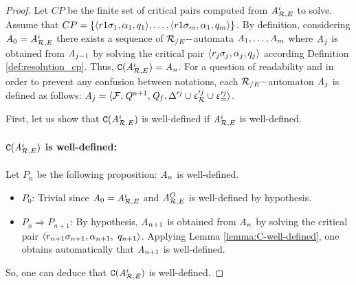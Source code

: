 \begin{proof}

  Let $CP$ be the finite set of critical pairs computed from
  ${\it A}_{\mathcal R,E}^i$ to solve.  Assume that $CP=\{\langle
  r1\sigma_1,\alpha_1,q_1\rangle,\ldots, \langle r1\sigma_m,\alpha_1,q_m\rangle
  \}$. By definition, considering $\mathit A_0={\it A}_{\mathcal R,E}^i$ there exists a
  sequence of ${\mathcal R_{/E}}-$automata $\mathit A_1,\ldots,\mathit A_m$ where $\mathit A_j$ is obtained
  from $\mathit A_{j-1}$ by solving the critical pair $\langle r_j\sigma_j,
  \alpha_j,q_j\rangle$ according Definition \ref{def:resolution_cp}. Thus, 
  $\mathtt{C}({\it A}_{\mathcal R,E}^i)=\mathit A_n$. For a 
  question of readability and in order to prevent any confusion between notations, 
  each ${\mathcal R_{/E}}-$automaton $\mathit A_j$ is defined as follows:  $\mathit A_j=\langle \mathcal{F},\mathit Q^{n+1},\mathit Q_{f},\Delta'^{j}\cup \upvarepsilon_{\mathcal R}'^{j}\cup\upvarepsilon_{=}'^{j} \rangle$.

  First, let us show that $\mathtt{C}({\it A}_{\mathcal R,E}^i)$ is well-defined if ${\it A}_{\mathcal R,E}^i$ is well-defined.

  \paragraph{ $\mathtt{C}({\it A}_{\mathcal R,E}^i)$ is well-defined: }
    
  Let $P_n$ be the following proposition: $\mathit A_n$ is well-defined. 

  \begin{itemize}
  \item $P_0$: Trivial since $\mathit A_0={\it A}_{\mathcal R,E}^i$ and ${\it A}_{\mathcal R,E}^O$ is well-defined by hypothesis.
  \item $ P_n\Rightarrow P_{n+1}$: By hypothesis, $\mathit A_{n+1}$ is
    obtained from $\mathit A_n$ by solving the critical pair $\langle
    r_{n+1}\sigma_{n+1},\alpha_{n+1},$ $q_{n+1}\rangle$. Applying Lemma \ref{lemma:C-well-defined}, 
    one obtains automatically that $\mathit A_{n+1}$ is well-defined. 
  \end{itemize}
  So, one can deduce that $\mathtt{C}({\it A}_{\mathcal R,E}^i)$ is well-defined.


\end{proof}

